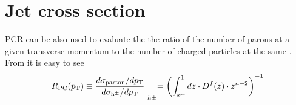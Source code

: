 \documentclass[12pt]{article}
\begin{document}
\section{Jet cross section}

PCR  can be also used to evaluate the 
the ratio of the number of parons at a given transverse momentum to the number of charged particles at the
same \pt{}. From  it is easy to see 
\begin{equation}\label{eq:pcr}
R_{\rm PC}(p_{\rm T}) \equiv \frac{d\sigma_{\rm parton}/dp_{\rm T}}{d\sigma_{\rm h^\pm}/dp_{\rm T}}\Biggl\vert_{h\pm} = \left(\int_{x_{\rm T}}^{1} dz \cdot D^f(z)\cdot z^{n-2}\right)^{-1}
\end{equation}
\end{document}
